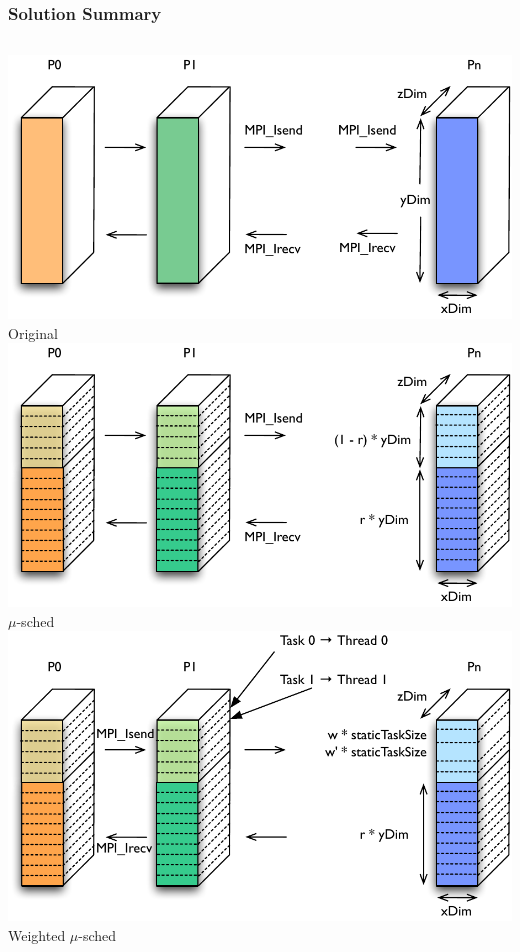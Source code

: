 \begin{frame}  
\frametitle{Solution Summary} 
\begin{columns}
\includegraphics[width=\textwidth]{images/mpi_decomp}
Original 
\includegraphics[width=\textwidth]{images/hybrid_decomp}
$\mu$-sched 
\includegraphics[width=\textwidth]{images/weighted_decomp}
Weighted $\mu$-sched 
\end{columns}
\end{frame} 


